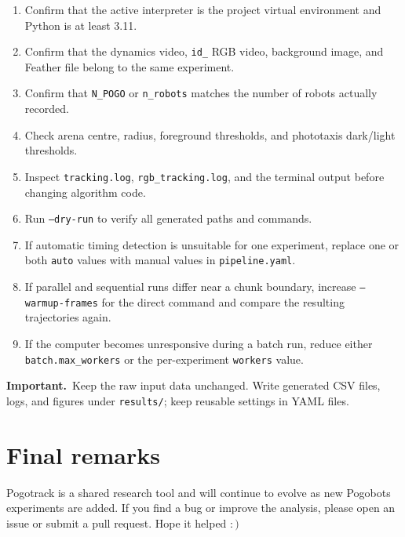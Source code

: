 \documentclass[11pt,a4paper]{article}
\newcommand{\important}[1]{%
  \begin{tcolorbox}[
    colback=PogoLight,
    colframe=PogoGreen,
    boxrule=0.7pt,
    arc=2mm,
    left=4mm,right=4mm,top=2.5mm,bottom=2.5mm
  ]
  \textcolor{PogoDark}{\textbf{Important.}}~#1
  \end{tcolorbox}%
}
\begin{document}
\begin{enumerate}
  \item Confirm that the active interpreter is the project virtual environment and Python is at least 3.11.
  \item Confirm that the dynamics video, \texttt{id\_} RGB video, background image, and Feather file belong to the same experiment.
  \item Confirm that \texttt{N\_POGO} or \texttt{n\_robots} matches the number of robots actually recorded.
  \item Check arena centre, radius, foreground thresholds, and phototaxis dark/light thresholds.
  \item Inspect \texttt{tracking.log}, \texttt{rgb\_tracking.log}, and the terminal output before changing algorithm code.
  \item Run \texttt{--dry-run} to verify all generated paths and commands.
  \item If automatic timing detection is unsuitable for one experiment, replace one or both \texttt{auto} values with manual values in \texttt{pipeline.yaml}.
  \item If parallel and sequential runs differ near a chunk boundary, increase \texttt{--warmup-frames} for the direct command and compare the resulting trajectories again.
  \item If the computer becomes unresponsive during a batch run, reduce either \texttt{batch.max\_workers} or the per-experiment \texttt{workers} value.
\end{enumerate}

\important{Keep the raw input data unchanged. Write generated CSV files, logs, and figures under \texttt{results/}; keep reusable settings in YAML files.}

\section{Final remarks}

Pogotrack is a shared research tool and will continue to evolve as new Pogobots experiments are added. If you find a bug or improve the analysis, please open an issue or submit a pull request.
Hope it helped $:)$
\end{document}
